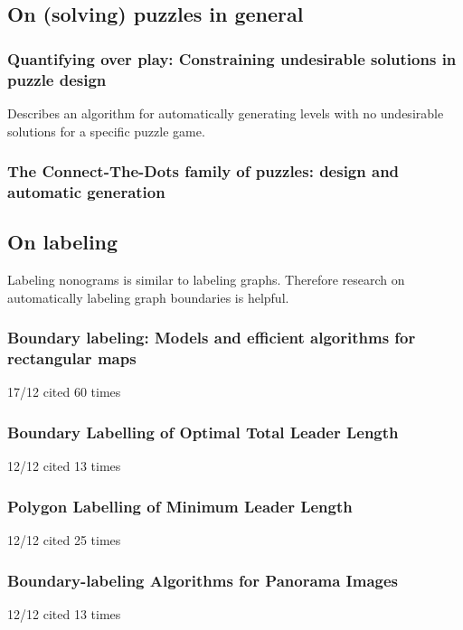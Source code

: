 \documentclass[a4paper]{article}
\begin{document}
\subsection{On (solving) puzzles in general}

\subsubsection{Quantifying over play: Constraining undesirable solutions in puzzle design \cite{smith2013quantifying}}
Describes an algorithm for automatically generating levels with no undesirable solutions for a specific puzzle game.

\subsubsection{The Connect-The-Dots family of puzzles: design and automatic generation \cite{loffler2014connect}}
\subsection{On labeling}
Labeling nonograms is similar to labeling graphs. Therefore research on automatically labeling graph boundaries is helpful.\\

\subsubsection{Boundary labeling: Models and efficient algorithms for rectangular maps \cite{bekos2007boundary}}
17/12 cited 60 times

\subsubsection{Boundary Labelling of Optimal Total Leader Length \cite{boundaryLabelling}}
12/12 cited 13 times

\subsubsection{Polygon Labelling of Minimum Leader Length \cite{Bekos:2006:PLM:1151903.1151906}}
12/12 cited 25 times

\subsubsection{Boundary-labeling Algorithms for Panorama Images \cite{Gemsa:2011:BAP:2093973.2094012}}
12/12 cited 13 times
\end{document}
